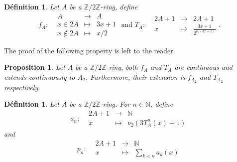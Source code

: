 \documentclass[12pt,a4paper]{article}
\newtheorem{prop}[lem]{Proposition}
\newtheorem{defi}[lem]{Définition}
\newcommand{\fonction}[5]{\displaystyle#1:\begin{array}{l|rcl}
& \displaystyle #2 & \longrightarrow & \displaystyle #3 \\
    & \displaystyle #4 & \longmapsto & \displaystyle #5 \end{array}}
\newcommand{\fonctiondeux}[7]{\displaystyle#1:\begin{array}{l|rcl}
& \displaystyle #2 & \longrightarrow & \displaystyle #3 \\
    & \displaystyle #4 & \longmapsto & \displaystyle #5 \\
     & \displaystyle #6 & \longmapsto & \displaystyle #7\end{array}}
\def\NN{\mathbb{N}}
\def\ZZ{\mathbb{Z}}
\begin{document}
\begin{defi}  Let $A$ be a  $\ZZ/2\ZZ$-ring, define
$$ \fonctiondeux{f_A}{A}{A}{x\in 2A}{3x+1}{x\notin 2A}{x/2} \text{ and }\fonction{T_A}{2A+1}{2A+1}{x}{\frac{3x+1}{2^{\nu_2(3x+1)}}}.$$
\end{defi}
The proof of the following property is left to the reader.
\begin{prop} Let $A$ be a $\ZZ/2\ZZ$-ring, both $f_A$ and $T_A$ are continuous and extends continuously to $A_2$. Furthermore, their extension is $f_{A_2}$ and $T_{A_2}$ respectively.
\end{prop}

\begin{defi} Let $A$ be a $\ZZ/2\ZZ$-ring. 
For $n\in \NN$, define $$\fonction{a_n}{2A+1}{\NN}{x}{\nu_2(3 T^n_A(x)+1)}$$ and 
$$\fonction{p_n}{2A+1}{\NN}{x}{\sum_{k<n}a_k(x)}$$

\end{defi}
\end{document}
